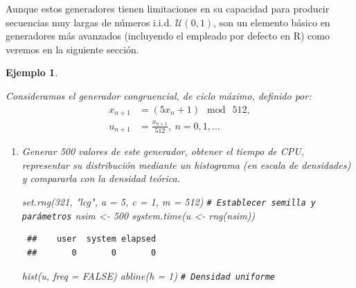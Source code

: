 \documentclass[
]{book}
\newenvironment{Shaded}{\begin{snugshade}}{\end{snugshade}}
\newcommand{\AttributeTok}[1]{\textcolor[rgb]{0.77,0.63,0.00}{#1}}
\newcommand{\CommentTok}[1]{\textcolor[rgb]{0.56,0.35,0.01}{\textit{#1}}}
\newcommand{\ConstantTok}[1]{\textcolor[rgb]{0.00,0.00,0.00}{#1}}
\newcommand{\DecValTok}[1]{\textcolor[rgb]{0.00,0.00,0.81}{#1}}
\newcommand{\FunctionTok}[1]{\textcolor[rgb]{0.00,0.00,0.00}{#1}}
\newcommand{\NormalTok}[1]{#1}
\newcommand{\OtherTok}[1]{\textcolor[rgb]{0.56,0.35,0.01}{#1}}
\newcommand{\StringTok}[1]{\textcolor[rgb]{0.31,0.60,0.02}{#1}}
\theoremstyle{break}
\newtheorem{example}{Ejemplo}[chapter]
\theoremstyle{nonumberplain}
\renewcommand{\CommentTok}[1]{\textcolor[rgb]{0.41,0.41,0.41}{\texttt{#1}}}
\begin{document}
Aunque estos generadores tienen limitaciones en su capacidad para producir secuencias muy largas de números i.i.d. \(\mathcal{U}(0,1)\), son un elemento básico en generadores más avanzados (incluyendo el empleado por defecto en R) como veremos en la siguiente sección.

\begin{example}
\protect\hypertarget{exm:congru512}{}\label{exm:congru512}

Consideramos el generador congruencial, de ciclo máximo, definido por:
\[\begin{aligned}
x_{n+1}  & =(5x_{n}+1)\ \bmod\ 512,\nonumber\\
u_{n+1}  & =\frac{x_{n+1}}{512},\ n=0,1,\dots\nonumber
\end{aligned}\]

\begin{enumerate}
\def\labelenumi{\alph{enumi})}
\item
  Generar 500 valores de este generador, obtener el tiempo de CPU,
  representar su distribución mediante un histograma (en escala
  de densidades) y compararla con la densidad teórica.

\begin{Shaded}
\begin{Highlighting}[]
\FunctionTok{set.rng}\NormalTok{(}\DecValTok{321}\NormalTok{, }\StringTok{"lcg"}\NormalTok{, }\AttributeTok{a =} \DecValTok{5}\NormalTok{, }\AttributeTok{c =} \DecValTok{1}\NormalTok{, }\AttributeTok{m =} \DecValTok{512}\NormalTok{)  }\CommentTok{\# Establecer semilla y parámetros}
\NormalTok{nsim }\OtherTok{\textless{}{-}} \DecValTok{500}
\FunctionTok{system.time}\NormalTok{(u }\OtherTok{\textless{}{-}} \FunctionTok{rng}\NormalTok{(nsim)) }
\end{Highlighting}
\end{Shaded}

\begin{verbatim}
 ##    user  system elapsed 
 ##       0       0       0
\end{verbatim}

\begin{Shaded}
\begin{Highlighting}[]
\FunctionTok{hist}\NormalTok{(u, }\AttributeTok{freq =} \ConstantTok{FALSE}\NormalTok{)}
\FunctionTok{abline}\NormalTok{(}\AttributeTok{h =} \DecValTok{1}\NormalTok{)                   }\CommentTok{\# Densidad uniforme}
\end{Highlighting}
\end{Shaded}


\end{enumerate}
\end{example}
\end{document}
